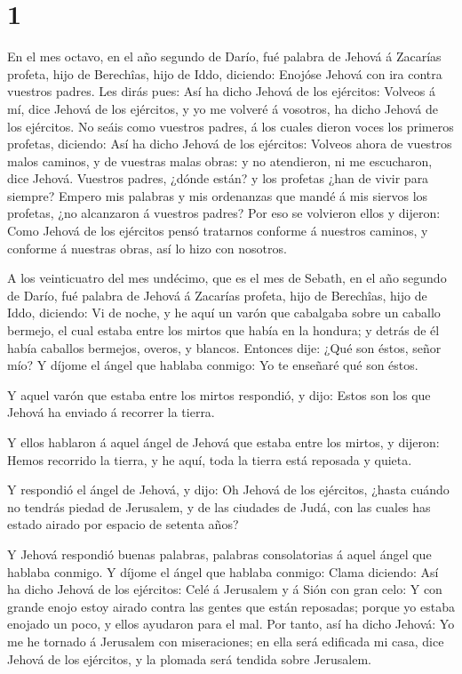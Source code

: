 \hypertarget{section}{%
\section{1}\label{section}}

 En el mes octavo, en el año segundo de Darío, fué palabra
de Jehová á Zacarías profeta, hijo de Berechîas, hijo de Iddo, diciendo:
 Enojóse Jehová con ira contra vuestros padres. 
Les dirás pues: Así ha dicho Jehová de los ejércitos: Volveos á mí, dice
Jehová de los ejércitos, y yo me volveré á vosotros, ha dicho Jehová de
los ejércitos.  No seáis como vuestros padres, á los cuales
dieron voces los primeros profetas, diciendo: Así ha dicho Jehová de los
ejércitos: Volveos ahora de vuestros malos caminos, y de vuestras malas
obras: y no atendieron, ni me escucharon, dice Jehová. 
Vuestros padres, ¿dónde están? y los profetas ¿han de vivir para
siempre?  Empero mis palabras y mis ordenanzas que mandé á
mis siervos los profetas, ¿no alcanzaron á vuestros padres? Por eso se
volvieron ellos y dijeron: Como Jehová de los ejércitos pensó tratarnos
conforme á nuestros caminos, y conforme á nuestras obras, así lo hizo
con nosotros.

 A los veinticuatro del mes undécimo, que es el mes de
Sebath, en el año segundo de Darío, fué palabra de Jehová á Zacarías
profeta, hijo de Berechîas, hijo de Iddo, diciendo:  Vi de
noche, y he aquí un varón que cabalgaba sobre un caballo bermejo, el
cual estaba entre los mirtos que había en la hondura; y detrás de él
había caballos bermejos, overos, y blancos.  Entonces dije:
¿Qué son éstos, señor mío? Y díjome el ángel que hablaba conmigo: Yo te
enseñaré qué son éstos.

 Y aquel varón que estaba entre los mirtos respondió, y
dijo: Estos son los que Jehová ha enviado á recorrer la tierra.

 Y ellos hablaron á aquel ángel de Jehová que estaba entre
los mirtos, y dijeron: Hemos recorrido la tierra, y he aquí, toda la
tierra está reposada y quieta.

 Y respondió el ángel de Jehová, y dijo: Oh Jehová de los
ejércitos, ¿hasta cuándo no tendrás piedad de Jerusalem, y de las
ciudades de Judá, con las cuales has estado airado por espacio de
setenta años?

 Y Jehová respondió buenas palabras, palabras consolatorias
á aquel ángel que hablaba conmigo.  Y díjome el ángel que
hablaba conmigo: Clama diciendo: Así ha dicho Jehová de los ejércitos:
Celé á Jerusalem y á Sión con gran celo:  Y con grande
enojo estoy airado contra las gentes que están reposadas; porque yo
estaba enojado un poco, y ellos ayudaron para el mal.  Por
tanto, así ha dicho Jehová: Yo me he tornado á Jerusalem con
miseraciones; en ella será edificada mi casa, dice Jehová de los
ejércitos, y la plomada será tendida sobre Jerusalem.

